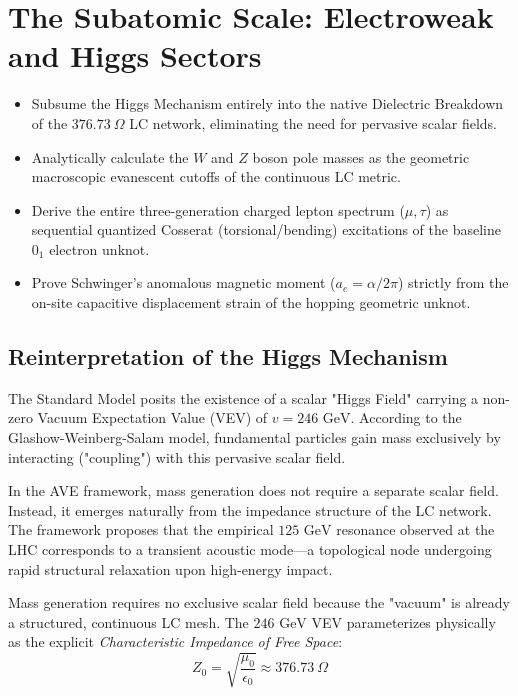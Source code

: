 \chapter{The Subatomic Scale: Electroweak and Higgs Sectors}
\label{ch:electroweak_higgs}

\begin{objectivebox}
\begin{itemize}
    \item Subsume the Higgs Mechanism entirely into the native Dielectric Breakdown of the $376.73\ \Omega$ LC network, eliminating the need for pervasive scalar fields.
    \item Analytically calculate the $W$ and $Z$ boson pole masses as the geometric macroscopic evanescent cutoffs of the continuous LC metric.
    \item Derive the entire three-generation charged lepton spectrum ($\mu, \tau$) as sequential quantized Cosserat (torsional/bending) excitations of the baseline $0_1$ electron unknot.
    \item Prove Schwinger's anomalous magnetic moment ($a_e = \alpha/2\pi$) strictly from the on-site capacitive displacement strain of the hopping geometric unknot.
\end{itemize}
\end{objectivebox}

\section{Reinterpretation of the Higgs Mechanism}
The Standard Model posits the existence of a scalar "Higgs Field" carrying a non-zero Vacuum Expectation Value (VEV) of $v = 246 \text{ GeV}$. According to the Glashow-Weinberg-Salam model, fundamental particles gain mass exclusively by interacting ("coupling") with this pervasive scalar field.

In the AVE framework, mass generation does not require a separate scalar field. Instead, it emerges naturally from the impedance structure of the LC network. The framework proposes that the empirical $125 \text{ GeV}$ resonance observed at the LHC corresponds to a transient acoustic mode---a topological node undergoing rapid structural relaxation upon high-energy impact.

Mass generation requires no exclusive scalar field because the "vacuum" is already a structured, continuous LC mesh. The $246 \text{ GeV}$ VEV parameterizes physically as the explicit \textit{Characteristic Impedance of Free Space}:
\begin{equation}
    Z_0 = \sqrt{\frac{\mu_0}{\epsilon_0}} \approx 376.73 \ \Omega
\end{equation}

